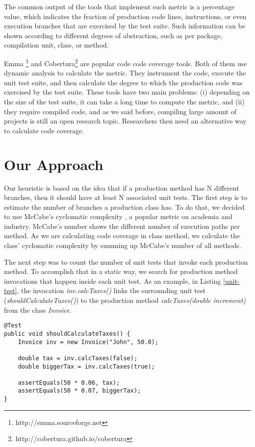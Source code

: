 \documentclass{sig-alternate}
\begin{document}
The common output of the tools that implement such metric is a percentage value, 
which indicates the fraction of production code lines, instructions, 
or even execution branches that are exercised by the test suite. Such information can be shown according to different
degrees of abstraction, such as per package, compilation unit, class, or method. 

Emma \footnote{http://emma.sourceforge.net} and Cobertura\footnote{http://cobertura.github.io/cobertura} are popular 
code code coverage tools. Both of them use dynamic analysis to calculate the metric. They instrument the code, execute 
the unit test suite, and then calculate the degree to which the production code was exercised by the test suite. 
These tools have two main problems: (i) depending on the size of the test suite, it can take a long time to compute
the metric, and (ii) they require compiled code, and as we said before, compiling large amount of projects is 
still an open research topic. Researchers then need an alternative way to calculate code coverage.


\section{Our Approach}
\label{sec-heuristic}

Our heuristic is based on the idea that if a production method has N different branches, then it should
have at least N associated unit tests. The first step is to estimate the number of branches 
a production class has. To do that, we decided to use McCabe's cyclomatic complexity \cite{mccabe}, a popular
metric on academia and industry.
McCabe's number shows the different number of execution paths per method. 
As we are calculating code coverage in class method, we calculate the class' cyclomatic complexity
by summing up McCabe's number of all methods.

The next step was to count the number of unit tests that invoke each production method. To accomplish that
in a static way, we search for production method invocations that happen inside each unit test. As an example, in Listing
\ref{unit-test}, the invocation \textit{inv.calcTaxes()} links the surrounding unit test (\textit{shouldCalculateTaxes()}) to 
the production method \textit{calcTaxes(double increment)} from the class \textit{Invoice}.

\begin{lstlisting}
@Test
public void shouldCalculateTaxes() {
	Invoice inv = new Invoice("John", 50.0);

	double tax = inv.calcTaxes(false);
	double biggerTax = inv.calcTaxes(true);
		
	assertEquals(50 * 0.06, tax);
	assertEquals(50 * 0.07, biggerTax);
}
\end{lstlisting}
\end{document}
